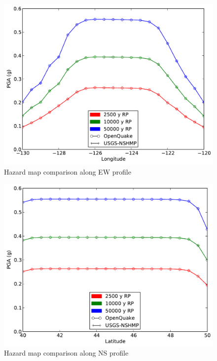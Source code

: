 \begin{figure}
\centering
\includegraphics[width=12cm]{./qareport/pictures/cascadia_char_oq_nshmp_ew.pdf}
\caption{Hazard map comparison along EW profile}
\label{fig:cascadia_char_ew}
\end{figure}
\begin{figure}
\centering
\includegraphics[width=12cm]{./qareport/pictures/cascadia_char_oq_nshmp_ns.pdf}
\caption{Hazard map comparison along NS profile}
\label{fig:cascadia_char_ns}
\end{figure}

